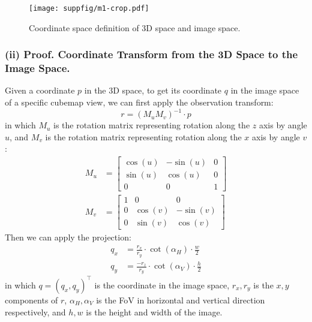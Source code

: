 \documentclass[runningheads]{llncs}
\begin{document}
\begin{figure}[!h]
	\centering
	\texttt{[image: suppfig/m1-crop.pdf]}
	\caption{Coordinate space definition of 3D space and image space.}
\label{fig:coord_def} 
\end{figure}

\subsubsection{\textbf{(ii) Proof. Coordinate Transform from the 3D Space to the Image Space.}}
Given a coordinate $p$ in the 3D space, to get its coordinate $q$ in the image space of a specific cubemap view, we can first apply the observation transform:
\begin{equation}\label{formula:1}
    r = (M_{u}M_{v})^{-1} \cdot p
\end{equation}
in which $M_{u}$ is the rotation matrix representing rotation along the $z$ axis by angle $u$, and $M_{v}$ is the rotation matrix representing rotation along the $x$ axis by angle $v$:
\begin{equation}\label{formula:2}
    \begin{aligned}
    M_{u}&=\begin{bmatrix}
\cos(u) & -\sin(u) & 0 \\ 
\sin(u) & \cos(u)  & 0 \\ 
0 & 0 & 1 
\end{bmatrix}\\
    M_{v}&=\begin{bmatrix}
1 & 0 & 0 \\
0 & \cos(v) & -\sin(v) \\ 
0 & \sin(v) & \cos(v)   
\end{bmatrix}
    \end{aligned}
\end{equation}
Then we can apply the projection:
\begin{equation}\label{formula:3}\begin{aligned}
    q_x &= \frac{r_x}{r_y}\cdot \cot(\alpha_H) \cdot \frac{w}{2} \\
    q_y &= \frac{-r_z}{r_y}\cdot \cot(\alpha_V) \cdot \frac{h}{2}
\end{aligned}\end{equation}
in which $q=(q_x, q_y)^\top$ is the coordinate in the image space, $r_x, r_y$ is the $x, y$ components of $r$, $\alpha_H, \alpha_V$ is the FoV in horizontal and vertical direction respectively, and $h, w$ is the height and width of the image. 
\end{document}
